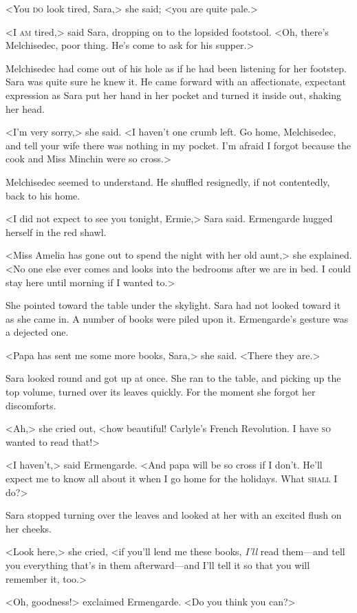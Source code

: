 <You \textsc{do} look tired, Sara,> she said; <you are quite pale.>

<I \textsc{am} tired,> said Sara, dropping on to the lopsided footstool. <Oh, there's Melchisedec, poor thing. He's come to ask for his supper.>

Melchisedec had come out of his hole as if he had been listening for her footstep. Sara was quite sure he knew it. He came forward with an affectionate, expectant expression as Sara put her hand in her pocket and turned it inside out, shaking her head.

<I'm very sorry,> she said. <I haven't one crumb left. Go home, Melchisedec, and tell your wife there was nothing in my pocket. I'm afraid I forgot because the cook and Miss Minchin were so cross.>

Melchisedec seemed to understand. He shuffled resignedly, if not contentedly, back to his home.

<I did not expect to see you tonight, Ermie,> Sara said. Ermengarde hugged herself in the red shawl.

<Miss Amelia has gone out to spend the night with her old aunt,> she explained. <No one else ever comes and looks into the bedrooms after we are in bed. I could stay here until morning if I wanted to.>

She pointed toward the table under the skylight. Sara had not looked toward it as she came in. A number of books were piled upon it. Ermengarde's gesture was a dejected one.

<Papa has sent me some more books, Sara,> she said. <There they are.>

Sara looked round and got up at once. She ran to the table, and picking up the top volume, turned over its leaves quickly. For the moment she forgot her discomforts.

<Ah,> she cried out, <how beautiful! Carlyle's French Revolution. I have \textsc{so} wanted to read that!>

<I haven't,> said Ermengarde. <And papa will be so cross if I don't. He'll expect me to know all about it when I go home for the holidays. What \textsc{shall} I do?>

Sara stopped turning over the leaves and looked at her with an excited flush on her cheeks.

<Look here,> she cried, <if you'll lend me these books, \textit{I'll} read them—and tell you everything that's in them afterward—and I'll tell it so that you will remember it, too.>

<Oh, goodness!> exclaimed Ermengarde. <Do you think you can?>

